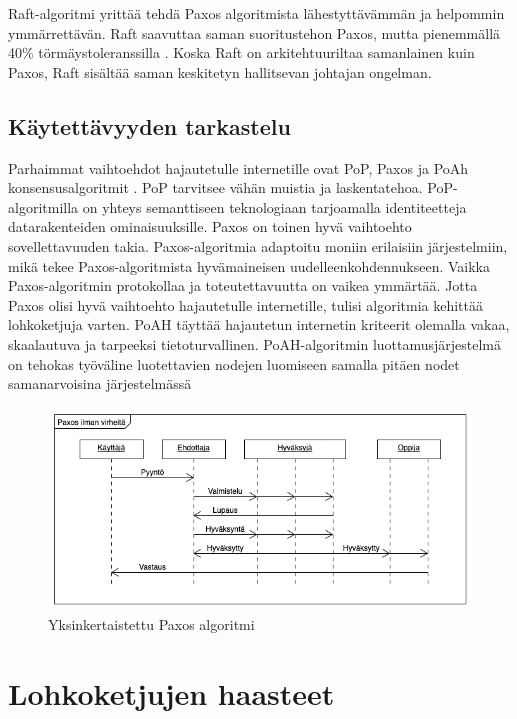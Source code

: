 \documentclass[utf8,bachelor]{gradu3}
\begin{document}
Raft-algoritmi yrittää tehdä Paxos algoritmista lähestyttävämmän ja helpommin ymmärrettävän. Raft saavuttaa saman suoritustehon Paxos, mutta pienemmällä 40\% törmäystoleranssilla \parencite{panda2019study}. 
Koska Raft on arkitehtuuriltaa samanlainen kuin Paxos, Raft sisältää saman keskitetyn hallitsevan johtajan ongelman.

\section{Käytettävyyden tarkastelu}
Parhaimmat vaihtoehdot hajautetulle internetille ovat PoP, Paxos ja PoAh konsensusalgoritmit \parencite{zarrin2021blockchain}. 
PoP tarvitsee vähän muistia ja laskentatehoa.
PoP-algoritmilla on yhteys semanttiseen teknologiaan tarjoamalla identiteetteja datarakenteiden ominaisuuksille.
Paxos on toinen hyvä vaihtoehto sovellettavuuden takia. Paxos-algoritmia adaptoitu moniin erilaisiin järjestelmiin, mikä tekee Paxos-algoritmista hyvämaineisen uudelleenkohdennukseen.
Vaikka Paxos-algoritmin protokollaa ja toteutettavuutta on vaikea ymmärtää. Jotta Paxos olisi hyvä vaihtoehto hajautetulle internetille, tulisi algoritmia kehittää lohkoketjuja varten.
PoAH täyttää hajautetun internetin kriteerit olemalla vakaa, skaalautuva ja tarpeeksi tietoturvallinen. PoAH-algoritmin luottamusjärjestelmä on tehokas työväline luotettavien nodejen luomiseen samalla pitäen nodet samanarvoisina järjestelmässä

\begin{figure}[h]\centering
  \includegraphics[width=\textwidth,keepaspectratio]{PaxosDiag}
  \caption[Yksinkertaistettu Paxos algoritmi]{Yksinkertaistettu Paxos algoritmi}
  \label{fig:Paxos}
\end{figure}

\chapter{Lohkoketjujen haasteet}\label{Haasteet}
\end{document}
